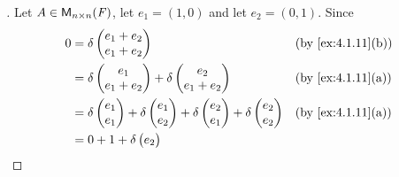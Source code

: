 \begin{proof}[]
	Let \(A \in \mathsf{M}_{{n} \times n}({\mathit{F}})\), let \(e_1 = (1, 0)\) and let \(e_2 = (0, 1)\).
	Since
	\begin{align*}
		0 & = \delta\begin{pmatrix}
			            e_1 + e_2 \\
			            e_1 + e_2
		            \end{pmatrix}               &  & \by{ex:4.1.11}[b]                                                     \\
		  & = \delta\begin{pmatrix}
			            e_1 \\
			            e_1 + e_2
		            \end{pmatrix} + \delta\begin{pmatrix}
			                                  e_2 \\
			                                  e_1 + e_2
		                                  \end{pmatrix} &  & \by{ex:4.1.11}[a]                                             \\
		  & = \delta\begin{pmatrix}
			            e_1 \\
			            e_1
		            \end{pmatrix} + \delta\begin{pmatrix}
			                                  e_1 \\
			                                  e_2
		                                  \end{pmatrix} + \delta\begin{pmatrix}
			                                                        e_2 \\
			                                                        e_1
		                                                        \end{pmatrix} + \delta\begin{pmatrix}
			                                                                              e_2 \\
			                                                                              e_2
		                                                                              \end{pmatrix} &  & \by{ex:4.1.11}[a] \\
		  & = 0 + 1 + \delta\begin{pmatrix}
			                    e_2 \\

\end{pmatrix}
\end{align*}
\end{proof}
